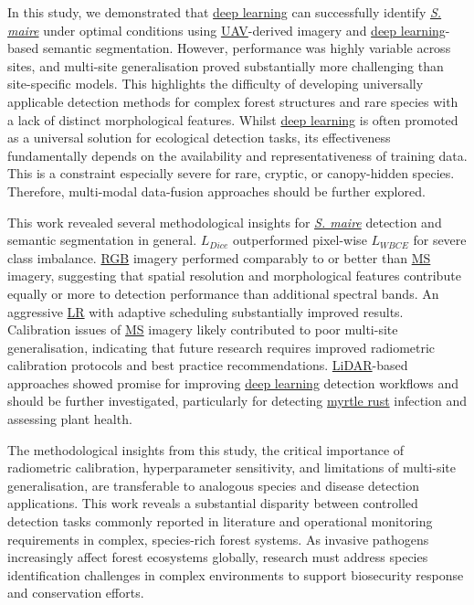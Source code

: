 \documentclass[
]{scrreprt}
\begin{document}
In this study, we demonstrated that \hyperref[acronyms_DL]{deep
learning} can successfully identify \hyperref[acronyms_SM]{\emph{S.
maire}} under optimal conditions using
\hyperref[acronyms_UAV]{UAV}-derived imagery and
\hyperref[acronyms_DL]{deep learning}-based semantic segmentation.
However, performance was highly variable across sites, and multi-site
generalisation proved substantially more challenging than site-specific
models. This highlights the difficulty of developing universally
applicable detection methods for complex forest structures and rare
species with a lack of distinct morphological features. Whilst
\hyperref[acronyms_DL]{deep learning} is often promoted as a universal
solution for ecological detection tasks, its effectiveness fundamentally
depends on the availability and representativeness of training data.
This is a constraint especially severe for rare, cryptic, or
canopy-hidden species. Therefore, multi-modal data-fusion approaches
should be further explored.

This work revealed several methodological insights for
\hyperref[acronyms_SM]{\emph{S. maire}} detection and semantic
segmentation in general. \hyperref[acronyms_DICE]{\(L_{Dice}\)}
outperformed pixel-wise \hyperref[acronyms_WBCE]{\(L_{WBCE}\)} for
severe class imbalance. \hyperref[acronyms_RGB]{RGB} imagery performed
comparably to or better than \hyperref[acronyms_MS]{MS} imagery,
suggesting that spatial resolution and morphological features contribute
equally or more to detection performance than additional spectral bands.
An aggressive \hyperref[acronyms_LR]{LR} with adaptive scheduling
substantially improved results. Calibration issues of
\hyperref[acronyms_MS]{MS} imagery likely contributed to poor multi-site
generalisation, indicating that future research requires improved
radiometric calibration protocols and best practice recommendations.
\hyperref[acronyms_LiDAR]{LiDAR}-based approaches showed promise for
improving \hyperref[acronyms_DL]{deep learning} detection workflows and
should be further investigated, particularly for detecting
\hyperref[acronyms_MR]{myrtle rust} infection and assessing plant
health.

The methodological insights from this study, the critical importance of
radiometric calibration, hyperparameter sensitivity, and limitations of
multi-site generalisation, are transferable to analogous species and
disease detection applications. This work reveals a substantial
disparity between controlled detection tasks commonly reported in
literature and operational monitoring requirements in complex,
species-rich forest systems. As invasive pathogens increasingly affect
forest ecosystems globally, research must address species identification
challenges in complex environments to support biosecurity response and
conservation efforts.
\end{document}
